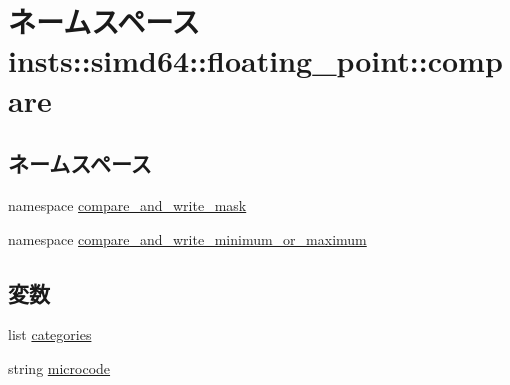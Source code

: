 \hypertarget{namespaceinsts_1_1simd64_1_1floating__point_1_1compare}{
\section{ネームスペース insts::simd64::floating\_\-point::compare}
\label{namespaceinsts_1_1simd64_1_1floating__point_1_1compare}
}
\subsection*{ネームスペース}
\begin{DoxyCompactItemize}
\item 
namespace \hyperlink{namespaceinsts_1_1simd64_1_1floating__point_1_1compare_1_1compare__and__write__mask}{compare\_\-and\_\-write\_\-mask}
\item 
namespace \hyperlink{namespaceinsts_1_1simd64_1_1floating__point_1_1compare_1_1compare__and__write__minimum__or__maximum}{compare\_\-and\_\-write\_\-minimum\_\-or\_\-maximum}
\end{DoxyCompactItemize}
\subsection*{変数}
\begin{DoxyCompactItemize}
\item 
list \hyperlink{namespaceinsts_1_1simd64_1_1floating__point_1_1compare_a273cf0f1630af14c1582f05e53354a55}{categories}
\item 
string \hyperlink{namespaceinsts_1_1simd64_1_1floating__point_1_1compare_a770f11a173e99389a8802f0107ed8f52}{microcode}
\end{DoxyCompactItemize}


